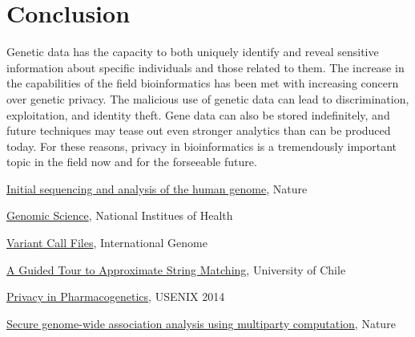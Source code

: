 \section{Conclusion}

Genetic data has the capacity to both uniquely identify and reveal sensitive information about specific individuals and those related to them. The increase in the capabilities of the field bioinformatics has been met with increasing concern over genetic privacy. The malicious use of genetic data can lead to discrimination, exploitation, and identity theft. Gene data can also be stored indefinitely, and future techniques may tease out even stronger analytics than can be produced today. For these reasons, privacy in bioinformatics is a tremendously important topic in the field now and for the forseeable future.

\begin{thebibliography}{6}
  
  \href{https://www.nature.com/articles/35057062}{Initial sequencing and analysis of the human genome}, Nature

  \href{https://www.genome.gov/19016904/faq-about-genetic-and-genomic-science/}{Genomic Science}, National Institues of Health

  \href{https://www.internationalgenome.org/wiki/Analysis/vcf4.0}{Variant Call Files}, International Genome
  
  \href{https://repositorio.uchile.cl/bitstream\-/handle/2250/126168/Navarro\_Gonzalo\-\_Guided\_tour.pdf}{A Guided Tour to Approximate String Matching}, University of Chile

  \href{https://www.usenix.org/system/files/conference/usenixsecurity14/sec14-paper-fredrikson-privacy.pdf}{Privacy in Pharmacogenetics}, USENIX 2014

  \href{https://www.nature.com/articles/nbt.4108}{Secure genome-wide association analysis using multiparty computation}, Nature
  
\end{thebibliography}
